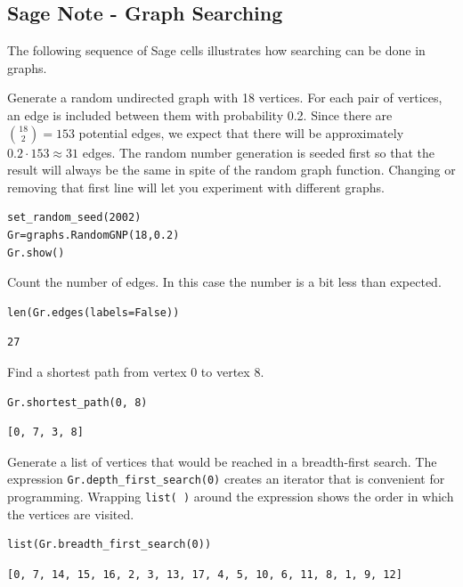 \documentclass[10pt,]{book}
\theoremstyle{plain}
\theoremstyle{definition}
\theoremstyle{definition}
\theoremstyle{definition}
\theoremstyle{definition}
\theoremstyle{definition}
\numberwithin{equation}{section}
\begin{document}
\subsection[Sage Note - Graph Searching]{Sage Note - Graph Searching}\label{ss-sage-note-search}
The following sequence of Sage cells illustrates how searching can be done in graphs.%
\par
Generate a random undirected graph with 18 vertices. For each pair of vertices, an edge is included between them with probability 0.2. Since there are \(\binom{18}{2}=153\) potential edges, we expect that there will be approximately \(0.2 \cdot 153 \approx 31\) edges.  The random number generation is seeded first so that the result will always be the same in spite of the random graph function.  Changing or removing that first line will let you experiment with different graphs.%
\begin{lstlisting}[style=sageinput]
set_random_seed(2002)
Gr=graphs.RandomGNP(18,0.2)
Gr.show()
\end{lstlisting}
\par
Count the number of edges. In this case the number is a bit less than expected.%
\begin{lstlisting}[style=sageinput]
len(Gr.edges(labels=False))
\end{lstlisting}
\begin{lstlisting}[style=sageoutput]
27
\end{lstlisting}
\par
Find a shortest path from vertex 0 to vertex 8.%
\begin{lstlisting}[style=sageinput]
Gr.shortest_path(0, 8)
\end{lstlisting}
\begin{lstlisting}[style=sageoutput]
[0, 7, 3, 8]
\end{lstlisting}
\par
Generate a list of vertices that would be reached in a breadth-first search.  The expression \lstinline?Gr.depth_first_search(0)? creates an iterator that is convenient for programming. Wrapping \lstinline?list( )? around the expression shows the order in which the vertices are visited.%
\begin{lstlisting}[style=sageinput]
list(Gr.breadth_first_search(0))
\end{lstlisting}
\begin{lstlisting}[style=sageoutput]
[0, 7, 14, 15, 16, 2, 3, 13, 17, 4, 5, 10, 6, 11, 8, 1, 9, 12]
\end{lstlisting}
\end{document}
